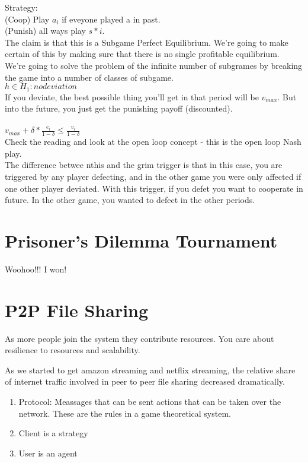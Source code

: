 \documentclass[12pt]{article}   	%
\begin{document}
Strategy: \\(Coop) Play $a_{i}$ if eveyone played a in past.\\(Punish) all ways play $s*{i}$.\\

\noindent
The claim is that this is a Subgame Perfect Equilibrium. We're going to make certain of this by making sure that there is no single profitable equilibrium.\\
We're going to solve the problem of the infinite number of subgrames by breaking the game into a number of classes of subgame.\\

$h \in H_{1}: no deviation$\\
If you deviate, the best possible thing you'll get in that period will be $v_{max}$. But into the future, you just get the punishing payoff (discounted). \\\\
$v_{max} + \delta * \frac{e_{i}}{1 - \delta} \leq \frac{v_{i}}{1-\delta}$\\
Check the reading and look at the open loop concept - this is the open loop Nash play.\\
The difference betwee nthis and the grim trigger is that in this case, you are triggered by any player defecting, and in the other game you were only affected if one other player deviated. With this trigger, if you defet you want to cooperate in future. In the other game, you wanted to defect in the other periods.

\section{Prisoner's Dilemma Tournament}

Woohoo!!! I won!
\section{P2P File Sharing}
As more people join the system they contribute resources. 
\noindent
You care about resilience to resources and scalability.

As we started to get amazon streaming and netflix streaming, the relative share of internet traffic involved in peer to peer file sharing decreased dramatically. 
\begin{enumerate}
\item Protocol: Meassages that can be sent actions that can be taken over the network. These are the rules in a game theoretical system.
\item Client is a strategy
\item User is an agent
\end{enumerate}
\end{document}
